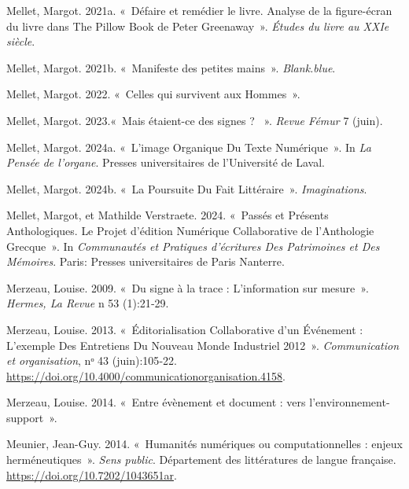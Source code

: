 \begin{CSLReferences}{1}{0}
\leavevmode{}%
Mellet, Margot. 2021a. {«~{D{é}faire et rem{é}dier le livre. Analyse de
la figure-{é}cran du livre dans The Pillow Book de Peter Greenaway}~»}.
\emph{{É}tudes du livre au XXIe si{è}cle}.

\leavevmode{}%
Mellet, Margot. 2021b. {«~{Manifeste des petites mains}~»}.
\emph{Blank.blue}.

\leavevmode{}%
Mellet, Margot. 2022. {«~{Celles qui survivent aux Hommes}~»}.

\leavevmode{}%
Mellet, Margot. 2023.{«~{{\guillemotleft}Mais {é}taient-ce des signes ?
{\guillemotright}}~»}. \emph{Revue F{é}mur} 7 (juin).

\leavevmode{}%
Mellet, Margot. 2024a. {«~L'image Organique Du Texte Num{é}rique~»}. In
\emph{La Pens{é}e de l'organe}. {Presses universitaires de
l'Universit{é} de Laval}.

\leavevmode{}%
Mellet, Margot. 2024b. {«~La Poursuite Du Fait Litt{é}raire~»}.
\emph{Imaginations}.

\leavevmode{}%
Mellet, Margot, et Mathilde Verstraete. 2024. {«~Pass{é}s et Pr{é}sents
Anthologiques. {Le} Projet d'{é}dition Num{é}rique Collaborative de
l'{Anthologie} Grecque~»}. In \emph{Communaut{é}s et Pratiques
d'{é}critures Des Patrimoines et Des M{é}moires}. {Paris}: {Presses
universitaires de Paris Nanterre}.

\leavevmode{}%
Merzeau, Louise. 2009. {«~{Du signe {à} la trace : L'information sur
mesure}~»}. \emph{Hermes, La Revue} n{\textdegree} 53 (1):21‑29.

\leavevmode{}%
Merzeau, Louise. 2013. {«~{É}ditorialisation Collaborative d'un
{É}v{é}nement : {L}'exemple Des {Entretiens} Du Nouveau Monde Industriel
2012~»}. \emph{Communication et organisation}, nᵒ 43 (juin):105‑22.
\url{https://doi.org/10.4000/communicationorganisation.4158}.

\leavevmode{}%
Merzeau, Louise. 2014. {«~{Entre {é}v{è}nement et document : vers
l'environnement-support}~»}.

\leavevmode{}%
Meunier, Jean-Guy. 2014. {«~{Humanit{é}s num{é}riques ou
computationnelles : enjeux herm{é}neutiques}~»}. \emph{Sens public}.
{D{é}partement des litt{é}ratures de langue fran{ç}aise}.
\url{https://doi.org/10.7202/1043651ar}.


\end{CSLReferences}
